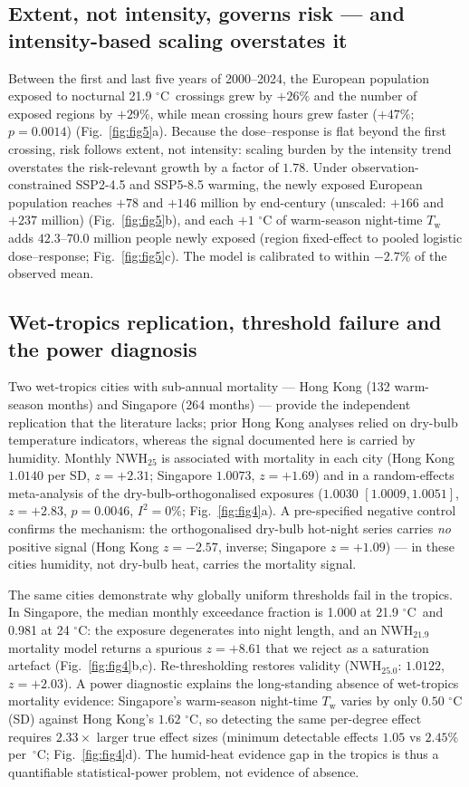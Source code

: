 \documentclass[12pt,a4paper]{article}
\newcommand{\dd}{\ensuremath{\,^{\circ}\mathrm{C}}}
\begin{document}
\subsection*{Extent, not intensity, governs risk --- and intensity-based scaling overstates it}
Between the first and last five years of 2000--2024, the European population exposed to nocturnal
21.9\,\dd~crossings grew by $+26\%$ and the number of exposed regions by $+29\%$, while mean
crossing hours grew faster ($+47\%$; $p=0.0014$) (Fig.~\ref{fig:fig5}a). Because the dose--response
is flat beyond the first crossing, risk follows extent, not intensity: scaling burden by the
intensity trend overstates the risk-relevant growth by a factor of $1.78$. Under
observation-constrained SSP2-4.5 and SSP5-8.5 warming, the newly exposed European population reaches
$+78$ and $+146$ million by end-century (unscaled: $+166$ and $+237$ million)
(Fig.~\ref{fig:fig5}b), and each $+1\,\dd$ of warm-season night-time $T_\mathrm{w}$ adds
$42.3$--$70.0$ million people newly exposed (region fixed-effect to pooled logistic dose--response;
Fig.~\ref{fig:fig5}c). The model is calibrated to within $-2.7\%$ of the observed mean.

\subsection*{Wet-tropics replication, threshold failure and the power diagnosis}
Two wet-tropics cities with sub-annual mortality --- Hong Kong (132 warm-season months) and
Singapore (264 months) --- provide the independent replication that the
literature lacks\citep{Sherwood2023}; prior Hong Kong analyses relied on dry-bulb temperature
indicators\citep{Ho2024}, whereas the signal documented here is carried by humidity. Monthly $\mathrm{NWH}_{25}$ is associated with mortality in each city
(Hong Kong $1.0140$ per SD, $z=+2.31$; Singapore $1.0073$, $z=+1.69$) and in a random-effects
meta-analysis of the dry-bulb-orthogonalised exposures ($1.0030$ $[1.0009,1.0051]$, $z=+2.83$,
$p=0.0046$, $I^2=0\%$; Fig.~\ref{fig:fig4}a). A pre-specified negative control confirms the
mechanism: the orthogonalised dry-bulb hot-night series carries \emph{no} positive signal (Hong Kong
$z=-2.57$, inverse; Singapore $z=+1.09$) --- in these cities humidity, not dry-bulb heat, carries
the mortality signal.

The same cities demonstrate why globally uniform thresholds fail in the tropics. In Singapore, the
median monthly exceedance fraction is 1.000 at 21.9\,\dd~and 0.981 at 24\,\dd: the exposure
degenerates into night length, and an $\mathrm{NWH}_{21.9}$ mortality model returns a spurious
$z=+8.61$ that we reject as a saturation artefact (Fig.~\ref{fig:fig4}b,c). Re-thresholding restores
validity ($\mathrm{NWH}_{25.0}$: $1.0122$, $z=+2.03$). A power diagnostic explains the long-standing
absence of wet-tropics mortality evidence: Singapore's warm-season night-time $T_\mathrm{w}$ varies
by only $0.50\,\dd$ (SD) against Hong Kong's $1.62\,\dd$, so detecting the same per-degree effect
requires $2.33\times$ larger true effect sizes (minimum detectable effects $1.05$ vs $2.45\%$ per
\dd; Fig.~\ref{fig:fig4}d). The humid-heat evidence gap in the tropics is thus a quantifiable
statistical-power problem, not evidence of absence.
\end{document}
